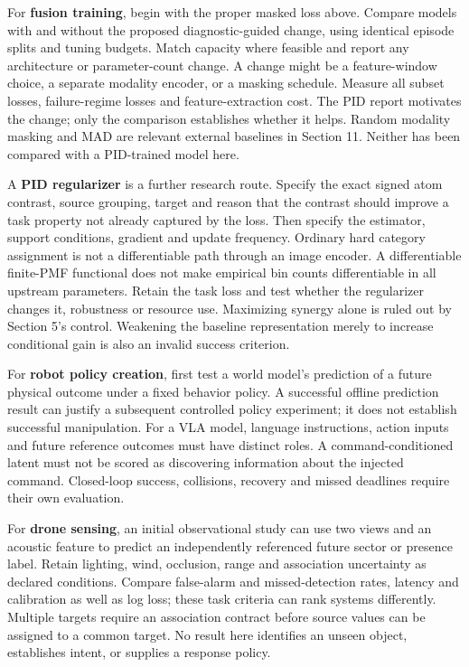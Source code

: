 \documentclass[11pt,a4paper]{article}
\begin{document}
For \textbf{fusion training}, begin with the proper masked loss above. Compare models with and without the proposed diagnostic-guided change, using identical episode splits and tuning budgets. Match capacity where feasible and report any architecture or parameter-count change. A change might be a feature-window choice, a separate modality encoder, or a masking schedule. Measure all subset losses, failure-regime losses and feature-extraction cost. The PID report motivates the change; only the comparison establishes whether it helps. Random modality masking and MAD are relevant external baselines in Section 11. Neither has been compared with a PID-trained model here.

A \textbf{PID regularizer} is a further research route. Specify the exact signed atom contrast, source grouping, target and reason that the contrast should improve a task property not already captured by the loss. Then specify the estimator, support conditions, gradient and update frequency. Ordinary hard category assignment is not a differentiable path through an image encoder. A differentiable finite-PMF functional does not make empirical bin counts differentiable in all upstream parameters. Retain the task loss and test whether the regularizer changes it, robustness or resource use. Maximizing synergy alone is ruled out by Section 5's control. Weakening the baseline representation merely to increase conditional gain is also an invalid success criterion.

For \textbf{robot policy creation}, first test a world model's prediction of a future physical outcome under a fixed behavior policy. A successful offline prediction result can justify a subsequent controlled policy experiment; it does not establish successful manipulation. For a VLA model, language instructions, action inputs and future reference outcomes must have distinct roles. A command-conditioned latent must not be scored as discovering information about the injected command. Closed-loop success, collisions, recovery and missed deadlines require their own evaluation.

For \textbf{drone sensing}, an initial observational study can use two views and an acoustic feature to predict an independently referenced future sector or presence label. Retain lighting, wind, occlusion, range and association uncertainty as declared conditions. Compare false-alarm and missed-detection rates, latency and calibration as well as log loss; these task criteria can rank systems differently. Multiple targets require an association contract before source values can be assigned to a common target. No result here identifies an unseen object, establishes intent, or supplies a response policy.
\end{document}
